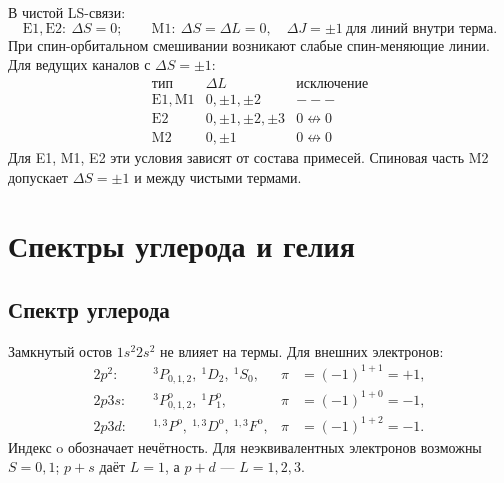 \documentclass[../final.tex]{subfiles}
\begin{document}
В чистой LS-связи:
\begin{equation*}
    \mathrm{E1,E2}:\ \Delta S=0;\qquad
    \mathrm{M1}:\ \Delta S=\Delta L=0,\quad
    \Delta J=\pm1\ \text{для линий внутри терма}.
\end{equation*}
При спин-орбитальном смешивании возникают слабые спин-меняющие линии.
Для ведущих каналов с \(\Delta S=\pm1\):
\begin{equation*}
    \begin{array}{c|c|c}
        \text{тип}&\Delta L&\text{исключение}\\ \hline
        \mathrm{E1,M1}&0,\pm1,\pm2&---\\
        \mathrm{E2}&0,\pm1,\pm2,\pm3&0\not\leftrightarrow0\\
        \mathrm{M2}&0,\pm1&0\not\leftrightarrow0
    \end{array}
\end{equation*}
Для E1, M1, E2 эти условия зависят от состава примесей.
Спиновая часть M2 допускает \(\Delta S=\pm1\) и между чистыми термами.

\section{Спектры углерода и гелия}

\subsection{Спектр углерода}

Замкнутый остов \(1s^2 2s^2\) не влияет на термы. Для внешних электронов:
\begin{align*}
    2p^2:&\quad{}^3P_{0,1,2},\ {}^1D_2,\ {}^1S_0,
       &\pi&=(-1)^{1+1}=+1,\\
    2p3s:&\quad{}^3P^{\mathrm o}_{0,1,2},\ {}^1P^{\mathrm o}_1,
       &\pi&=(-1)^{1+0}=-1,\\
    2p3d:&\quad{}^{1,3}P^{\mathrm o},\ {}^{1,3}D^{\mathrm o},\ {}^{1,3}F^{\mathrm o},
       &\pi&=(-1)^{1+2}=-1.
\end{align*}
Индекс \(\mathrm o\) обозначает нечётность.
Для неэквивалентных электронов возможны \(S=0,1\);
\(p+s\) даёт \(L=1\), а \(p+d\) --- \(L=1,2,3\).
\end{document}
